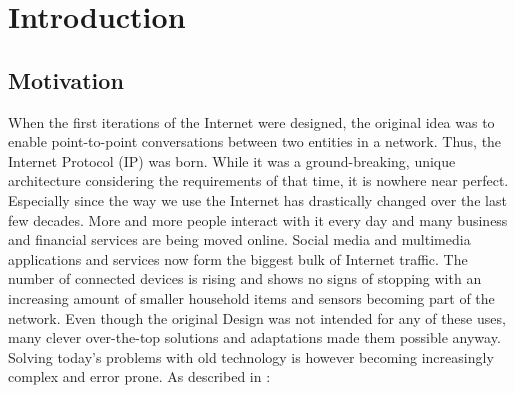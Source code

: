 \chapter{Introduction} \label{chapter:Introduction}

\section{Motivation}


When the first iterations of the Internet were designed, the original idea was to enable point-to-point conversations between two entities in a network. Thus, the Internet Protocol (IP) was born. While it was a ground-breaking, unique architecture considering the requirements of that time, it is nowhere near perfect. Especially since the way we use the Internet has drastically changed over the last few decades. More and more people interact with it every day and many business and financial services are being moved online. Social media and multimedia applications and services now form the biggest bulk of Internet traffic. The number of connected devices is rising and shows no signs of stopping with an increasing amount of smaller household items and sensors becoming part of the network. Even though the original Design was not intended for any of these uses, many clever over-the-top solutions and adaptations made them possible anyway. Solving today's problems with old technology is however becoming increasingly complex and error prone. As described in \cite{ZEBJ10}: \\

